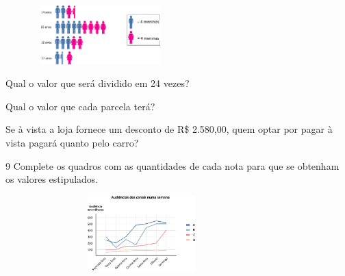 {\includegraphics[width=2.90025in,height=0.89174in]{media/image76.png}


\begin{escolha}

\item
  Qual o valor que será dividido em 24 vezes?

\item
  Qual o valor que cada parcela terá?

\item
  Se à vista a loja fornece um desconto de R\$ 2.580,00, quem optar por
  pagar à vista pagará quanto pelo carro?
\end{escolha}


\num{9}  Complete os quadros com as quantidades de cada nota para que se
obtenham os valores estipulados.

\begin{escolha}

\item
\includegraphics[width=4.14203in,height=1.14177in]{media/image77.png}



\end{escolha}}
